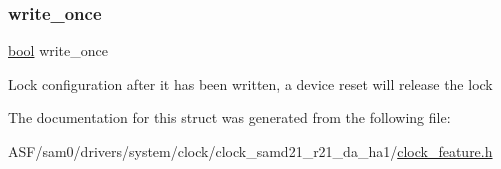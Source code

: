 \subsubsection{\texorpdfstring{write\_once}{write\_once}}
{\footnotesize\ttfamily \mbox{\hyperlink{group__group__sam0__utils_ga97a80ca1602ebf2303258971a2c938e2}{bool}} write\+\_\+once}

Lock configuration after it has been written, a device reset will release the lock 

The documentation for this struct was generated from the following file\+:\begin{DoxyCompactItemize}
\item 
A\+S\+F/sam0/drivers/system/clock/clock\+\_\+samd21\+\_\+r21\+\_\+da\+\_\+ha1/\mbox{\hyperlink{clock__feature_8h}{clock\+\_\+feature.\+h}}\end{DoxyCompactItemize}
